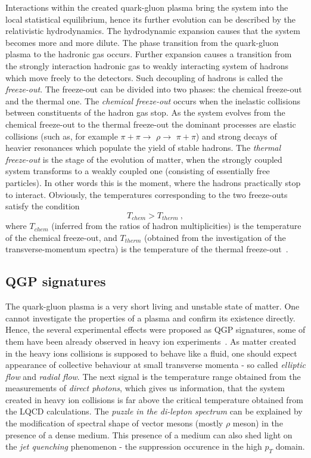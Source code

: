       Interactions within the created quark-gluon plasma bring the system into the local statistical equilibrium, hence its further evolution can be described by the relativistic hydrodynamics.
      The hydrodynamic expansion causes that the system becomes more and more dilute.
      The phase transition from the quark-gluon plasma to the hadronic gas occurs.
      Further expansion causes a transition from the strongly interaction hadronic gas to weakly interacting system of hadrons which move freely to the detectors.
      Such decoupling of hadrons is called the \textit{freeze-out}.
      The freeze-out can be divided into two phases: the chemical freeze-out and the thermal one.
      The \textit{chemical freeze-out} occurs when the inelastic collisions between constituents of the hadron gas stop.
      As the system evolves from the chemical freeze-out to the thermal freeze-out the dominant processes are elastic collisions (such as, for example $\pi+\pi\to$ $\rho \to$ $\pi+\pi$) and strong decays of heavier resonances which populate the yield of stable hadrons.
      The \textit{thermal freeze-out} is the stage of the evolution of matter, when the strongly coupled system transforms to a weakly coupled one (consisting of essentially free particles).
      In other words this is the moment, where the hadrons practically stop to interact.
      Obviously, the temperatures corresponding to the two freeze-outs satisfy the condition
      \begin{equation}
        T_{chem} > T_{therm}~,
      \end{equation}
      where $T_{chem}$ (inferred from the ratios of hadron multiplicities) is the temperature of the chemical freeze-out, and $T_{therm}$ (obtained from the investigation of the transverse-momentum spectra) is the temperature of the thermal freeze-out~\cite{florkowski}.

    \subsection{QGP signatures}
      The quark-gluon plasma is a very short living and unstable state of matter.
      One cannot investigate the properties of a plasma and confirm its existence directly.
      Hence, the several experimental effects were proposed as QGP signatures, some of them have been already observed in heavy ion experiments~\cite{drkisiel}.
      As matter created in the heavy ions collisions is supposed to behave like a fluid, one should expect appearance of collective behaviour at small transverse momenta - so called \textit{elliptic flow} and \textit{radial flow}.
      The next signal is the temperature range obtained from the measurements of \textit{direct photons}, which gives us information, that the system created in heavy ion collisions is far above the critical temperature obtained from the LQCD calculations.
      The \textit{puzzle in the di-lepton spectrum} can be explained by the modification of spectral shape of vector mesons (mostly $\rho$ meson) in the presence of a dense medium.
      This presence of a medium can also shed light on the \textit{jet quenching} phenomenon - the suppression occurence in the high $p_T$ domain.
